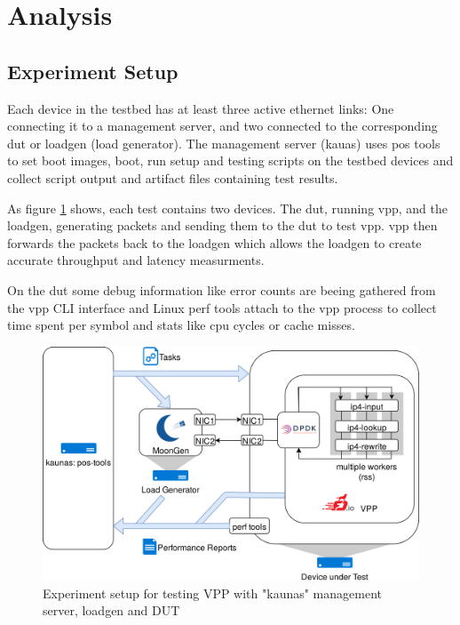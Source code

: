 
\section{Analysis}


\subsection{Experiment Setup}

Each device in the testbed has at least three active ethernet links:
One connecting it to a management server, and two connected to the
corresponding \Ac{dut} or loadgen (load generator). The management
server (kauas) uses pos tools to set boot images, boot, run setup and
testing scripts on the testbed devices and collect script output and
artifact files containing test results.

As figure \ref{setup} shows, each test contains two
devices. The \Ac{dut}, running \Ac{vpp}, and the loadgen, generating
packets and sending them to the \Ac{dut} to test \Ac{vpp}. \Ac{vpp}
then forwards the packets back to the loadgen which allows the loadgen
to create accurate throughput and latency measurments.

On the \Ac{dut} some debug information like error counts are beeing
gathered from the \Ac{vpp} CLI interface and Linux perf tools
\cite{perf} attach to the vpp process to collect time spent per symbol
and stats like cpu cycles or cache misses.

\begin{figure}[!ht]
\noindent\hspace{0.5mm}\includegraphics[width=\linewidth]{pics/topology.png}
\caption{Experiment setup for testing VPP with "kaunas" management server, loadgen and DUT}
\label{setup}
\end{figure}


